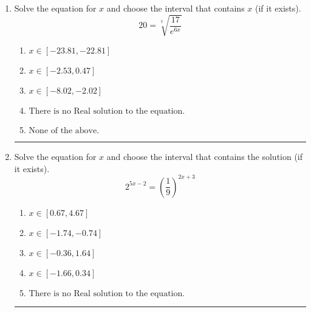 \documentclass[14pt]{extbook}
\newcommand{\litem}[1]{\item#1\hspace*{-1cm}\rule{\textwidth}{0.4pt}}
\begin{document}
\begin{enumerate}
{\begin{enumerate}[label=\Alph*.]
\end{enumerate} }
\litem{
 Solve the equation for $x$ and choose the interval that contains $x$ (if it exists).\[  20 = \sqrt[7]{\frac{17}{e^{6x}}} \]\begin{enumerate}[label=\Alph*.]
\item \( x \in [-23.81, -22.81] \)
\item \( x \in [-2.53, 0.47] \)
\item \( x \in [-8.02, -2.02] \)
\item \( \text{There is no Real solution to the equation.} \)
\item \( \text{None of the above.} \)

\end{enumerate} }
\litem{
Solve the equation for $x$ and choose the interval that contains the solution (if it exists).\[ 2^{5x-2} = \left(\frac{1}{9}\right)^{2x+3} \]\begin{enumerate}[label=\Alph*.]
\item \( x \in [0.67, 4.67] \)
\item \( x \in [-1.74, -0.74] \)
\item \( x \in [-0.36, 1.64] \)
\item \( x \in [-1.66, 0.34] \)
\item \( \text{There is no Real solution to the equation.} \)

\end{enumerate} }
\end{enumerate}
\end{document}
